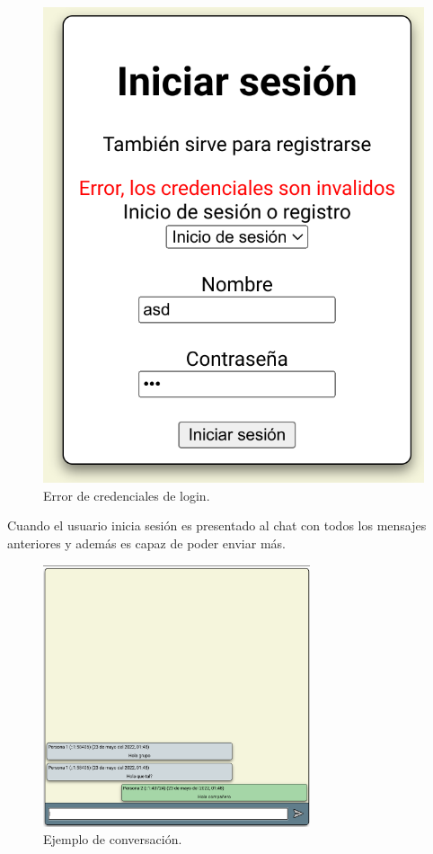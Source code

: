 \documentclass{article}
\begin{document}
\begin{figure}[H]
\begin{minipage}[H]{0.49\textwidth}
        \includegraphics[width=\textwidth]{images/errorlogin.png}
        \caption{Error de credenciales de login.}
    \end{minipage}
\end{figure}

Cuando el usuario inicia sesión es presentado al chat con todos los mensajes anteriores y además es capaz de poder enviar más.

\begin{figure}[H]
    \centering
    \includegraphics[width=0.7\textwidth]{images/chatmsg.png}
    \caption{Ejemplo de conversación.}
\end{figure}
\end{document}
